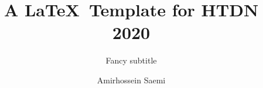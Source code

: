 \documentclass[10pt,sigconf]{acmart}
\begin{document}
\title{A \LaTeX\ Template for HTDN 2020}

\subtitle{Fancy subtitle}
 \author{Amirhossein Saemi}


\begin{abstract}
\end{abstract}

\maketitle





\end{document}
